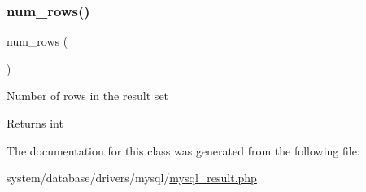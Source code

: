 \subsubsection{\texorpdfstring{num\+\_\+rows()}{num\_rows()}}
{\footnotesize\ttfamily num\+\_\+rows (\begin{DoxyParamCaption}{ }\end{DoxyParamCaption})}

Number of rows in the result set

\begin{DoxyReturn}{Returns}
int 
\end{DoxyReturn}


The documentation for this class was generated from the following file\+:\begin{DoxyCompactItemize}
\item 
system/database/drivers/mysql/\mbox{\hyperlink{mysql__result_8php}{mysql\+\_\+result.\+php}}\end{DoxyCompactItemize}
